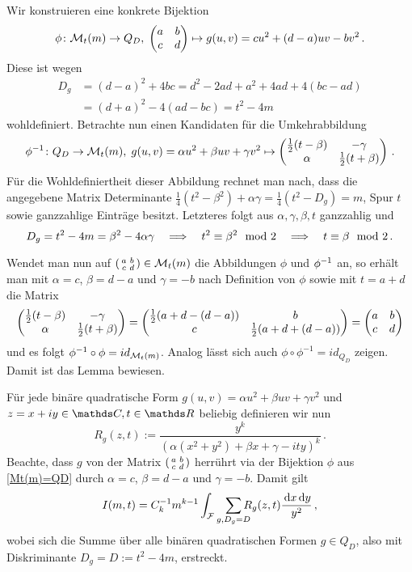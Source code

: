 \begin{bewe}
\begin{bewe}
Wir konstruieren eine konkrete Bijektion
\[
	\phi \colon \M_t (m) \to Q_D, \; \abcd \mapsto g(u, v) = cu^2 + (d-a)uv - bv^2
	\,.
\]
Diese ist wegen 
\begin{align*}
	D_g 
	&= (d-a)^2 + 4bc 
	= d^2 - 2ad + a^2 + 4ad + 4 (bc-ad) \\
	&= (d+a)^2 - 4(ad-bc) 
	= t^2 - 4m
\end{align*}
wohldefiniert. Betrachte nun einen Kandidaten für die Umkehrabbildung
\[
	\phi^{-1} \colon Q_D \to \M_t (m), \; g(u, v) = \alpha u^2 + \beta uv + \gamma v^2 \mapsto \mymat* {\frac 12 (t - \beta)} {-\gamma} \alpha {\frac 12(t + \beta)}
	\,.
\]
Für die Wohldefiniertheit dieser Abbildung rechnet man nach, dass die angegebene Matrix Determinante $\frac 14 (t^2 - \beta^2) + \alpha \gamma = \frac 14 (t^2 - D_g) = m$, Spur $t$ sowie ganzzahlige Einträge besitzt. Letzteres folgt aus $\alpha, \gamma, \beta, t$ ganzzahlig und
\[
	D_g = t^2 - 4m = \beta^2 - 4\alpha \gamma \quad \Longrightarrow \quad t^2 \equiv \beta^2 \mod 2 \quad \Longrightarrow \quad t \equiv \beta \mod 2
	\,.
\]

Wendet man nun auf $\abcd \in \M_t(m)$ die Abbildungen $\phi$ und $\phi^{-1}$ an, so erhält man mit $\alpha = c$, $\beta = d - a$ und $\gamma = -b$ nach Definition von $\phi$ sowie mit $t = a+d$ die Matrix
\[
	\mymat* {\frac 12 (t - \beta)} {-\gamma} \alpha {\frac 12(t + \beta)} = \mymat* {\frac 12 (a + d - (d-a))}bc{\frac 12(a + d + (d-a))} = \mymat* abcd
\]
und es folgt $\phi^{-1} \circ \phi = id_{\mathcal{M}_t(m)}$. Analog lässt sich auch $\phi \circ \phi^{-1} = id_{Q_D}$ zeigen. Damit ist das Lemma bewiesen.
\end{bewe}

Für jede binäre quadratische Form $g(u, v) = \alpha u^2 + \beta uv + \gamma v^2$ und $z = x + iy \in \CC, t \in \RR$ beliebig definieren wir nun
\[
	R_g(z,t) := \frac {y^k} {\left( \alpha(x^2 + y^2) + \beta x + \gamma - ity \right)^k}
	\,.
\]
Beachte, dass $g$ von der Matrix $\abcd$ herrührt via der Bijektion $\phi$ aus \autoref{Mt(m)=QD} durch $\alpha = c$, $\beta = d - a$ und $\gamma = -b$. Damit gilt
\[
	I(m, t) = C_k^{-1} m^{k-1} \int_\F \smashoperator[r]{\sum_{g, D_g = D}} R_g(z,t) \frac {\opd x \opd y}{y^2}
	\,,
\]
wobei sich die Summe über alle binären quadratischen Formen $g \in Q_D$, also mit Diskriminante $D_g = D := t^2 - 4m$, erstreckt.


\end{bewe}
